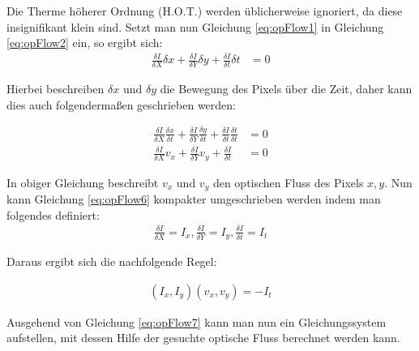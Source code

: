Die Therme höherer Ordnung (H.O.T.) werden üblicherweise ignoriert, da diese insignifikant klein sind.
Setzt man nun Gleichung \ref{eq:opFlow1} in Gleichung \ref{eq:opFlow2} ein, so ergibt sich:
\begin{subequations}\label{eq:opFlow4}
\begin{align}
\frac{\delta I}{\delta X}\delta x + \frac{\delta I}{\delta Y}\delta y + \frac{\delta I}{\delta t}\delta t &= 0 
\end{align}
\end{subequations}

Hierbei beschreiben $\delta x$ und $\delta y$ die Bewegung des Pixels über die Zeit, daher kann dies auch folgendermaßen geschrieben werden:

\begin{subequations}
\begin{align}
\frac{\delta I}{\delta X}\frac{\delta x}{\delta t} + \frac{\delta I}{\delta Y}\frac{\delta y}{\delta t} + \frac{\delta I}{\delta t}\frac{\delta t}{\delta t}  &= 0 \label{eq:opFlow5} \\
 \frac{\delta I}{\delta X}v_x + \frac{\delta I}{\delta Y}v_y + \frac{\delta I}{\delta t} &= 0\label{eq:opFlow6}
\end{align}
\end{subequations}

In obiger Gleichung beschreibt $v_x$ und $v_y$ den optischen Fluss des Pixels $x,y$.
Nun kann Gleichung \ref{eq:opFlow6} kompakter umgeschrieben werden indem man folgendes definiert:
\begin{subequations}
\begin{align*}
\frac{\delta I}{\delta X} = I_x, \frac{\delta I}{\delta Y} = I_y, \frac{\delta I}{\delta t} = I_t
\end{align*}
\end{subequations}

Daraus ergibt sich die nachfolgende Regel:

\begin{subequations}\label{eq:opFlow7} 
\begin{align}
(I_x,I_y) (v_x,v_y) = -I_t
\end{align}
\end{subequations}


Ausgehend von Gleichung \ref{eq:opFlow7} kann man nun ein Gleichungssystem aufstellen, mit dessen Hilfe der gesuchte optische Fluss berechnet werden kann.

